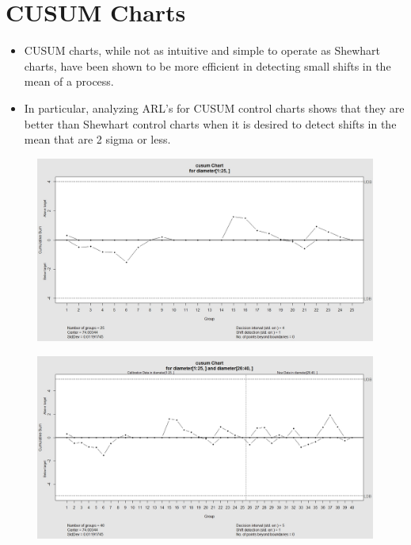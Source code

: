 \documentclass[SPC-MASTER.tex]{subfiles}
\begin{document}
\Large
\section{CUSUM Charts}
\begin{itemize}
\item CUSUM charts, while not as intuitive and simple to operate as Shewhart charts, have been shown to be more efficient in detecting small shifts in the mean of a process. \item In particular, analyzing ARL's for CUSUM control charts shows that they are better than Shewhart control charts when it is desired to detect shifts in the mean that are 2 sigma or less.
\end{itemize}




\begin{figure}[h!]
\centering
\includegraphics[width=0.7\linewidth]{images/CUSUMorings1}
\caption{}
\label{fig:CUSUMorings1}
\end{figure}

\begin{figure}[h!]
\centering
\includegraphics[width=0.7\linewidth]{images/CUSUMorings2}
\caption{}
\label{fig:CUSUMorings2}
\end{figure}
\end{document}

